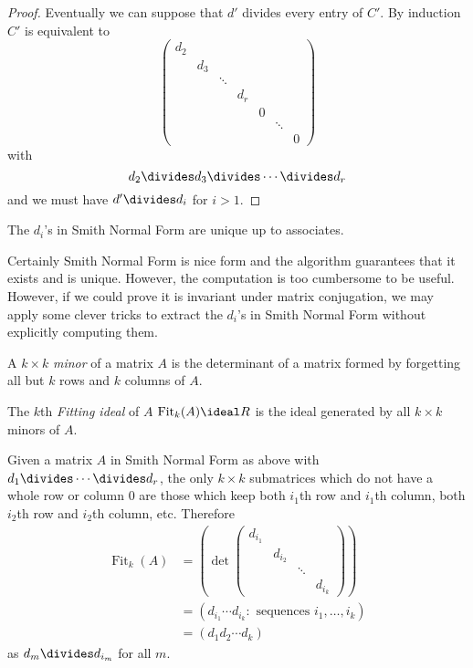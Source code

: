 \documentclass[a4paper]{article}
\theoremstyle{definition}
\DeclareMathOperator{\fit}{Fit}
\begin{document}
\begin{proof}
  Eventually we can suppose that \(d'\) divides every entry of \(C'\). By induction \(C'\) is equivalent to
  \[
    \begin{pmatrix}
      d_2 \\
      & d_3 \\
      & & \ddots \\
      & & & d_r \\
      & & & & 0 \\
      & & & & & \ddots \\
      & & & & & & 0
    \end{pmatrix}
  \]
  with
  \[
    d_2 \divides d_3 \divides \cdots \divides d_r
  \]
  and we must have \(d' \divides d_i\) for \(i > 1\).
\end{proof}

\begin{remark}
  The \(d_i\)'s in Smith Normal Form are unique up to associates.
\end{remark}

Certainly Smith Normal Form is nice form and the algorithm guarantees that it exists and is unique. However, the computation is too cumbersome to be useful. However, if we could prove it is invariant under matrix conjugation, we may apply some clever tricks to extract the \(d_i\)'s in Smith Normal Form without explicitly computing them.

\begin{definition}[Minor]
  A \(k \times k\) \emph{minor} of a matrix \(A\) is the determinant of a matrix formed by forgetting all but \(k\) rows and \(k\) columns of \(A\).
\end{definition}

\begin{definition}
  The \(k\)th \emph{Fitting ideal} of \(A\) \(\fit_k(A) \ideal R\) is the ideal generated by all \(k \times k\) minors of \(A\).
\end{definition}

Given a matrix \(A\) in Smith Normal Form as above with \(d_1 \divides \cdots \divides d_r\), the only \(k \times k\) submatrices which do not have a whole row or column \(0\) are those which keep both \(i_1\)th row and \(i_1\)th column, both \(i_2\)th row and \(i_2\)th column, etc. Therefore
\begin{align*}
  \fit_k(A) &= \left(\det
    \begin{pmatrix}
      d_{i_1} \\
      & d_{i_2} \\
      & & \ddots \\
      & & & d_{i_k}
    \end{pmatrix}
  \right) \\
            &= (d_{i_1} \cdots d_{i_k}: \text{ sequences } i_1, \dots, i_k) \\
            &= (d_1d_2 \cdots d_k)
\end{align*}
as \(d_m \divides d_{i_m}\) for all \(m\).
\end{document}
